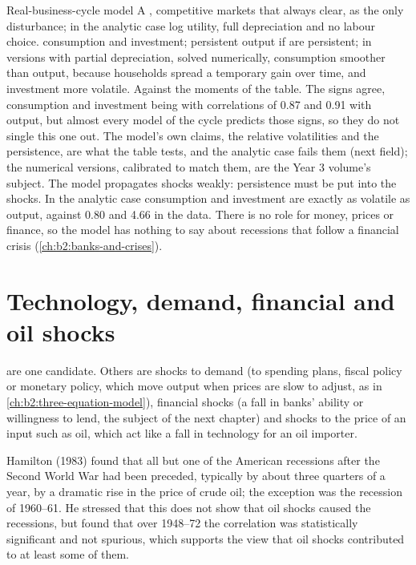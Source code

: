 \begin{model}{Real-business-cycle model}
\assumes A , competitive markets that always clear,  as the only disturbance;
in the analytic case log utility, full depreciation and no labour choice.
\predicts {} consumption and investment; persistent output if  are persistent; in versions
with partial depreciation, solved numerically, consumption smoother than output, because households spread a temporary gain
over time, and investment more volatile.
\tested Against the moments of the table. The signs agree, consumption and investment being  with correlations
of 0.87 and 0.91 with output, but almost every model of the cycle predicts those signs, so they do not single this one out.
The model's own claims, the relative volatilities and the persistence, are what the table tests, and the analytic case
fails them (next field); the numerical versions, calibrated to match them, are the Year 3 volume's subject.
\breaks The model propagates shocks weakly: persistence must be put into the shocks. In the analytic case consumption and
investment are exactly as volatile as output, against 0.80 and 4.66 in the data. There is no role for money, prices or finance, so the
model has nothing to say about recessions that follow a financial crisis (\cref{ch:b2:banks-and-crises}).
\end{model}

\section{Technology, demand, financial and oil shocks}\label{sec:b2:business-cycles:shocks}

 are one candidate. Others are shocks to demand (to spending plans, fiscal policy or monetary policy, which
move output when prices are slow to adjust, as in \cref{ch:b2:three-equation-model}), financial shocks (a fall in banks'
ability or willingness to lend, the subject of the next chapter) and shocks to the price of an input such as oil, which act
like a fall in technology for an oil importer.

\begin{record}
Hamilton (1983) found that all but one of the American recessions after the Second World War had been preceded, typically
by about three quarters of a year, by a dramatic rise in the price of crude oil; the exception was the recession of
1960--61. He stressed that this does not show that oil shocks caused the recessions, but found that over 1948--72 the
correlation was statistically significant and not spurious, which supports the view that oil shocks contributed to at least
some of them.
\end{record}

